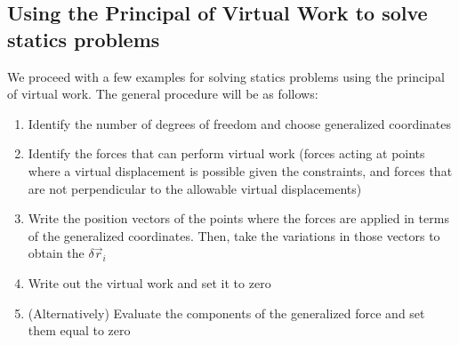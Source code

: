 \subsection{Using the Principal of Virtual Work to solve statics problems}
We proceed with a few examples for solving statics problems using the principal of virtual work. The general procedure will be as follows:
\begin{enumerate}
\item Identify the number of degrees of freedom and choose generalized coordinates 
\item Identify the forces that can perform virtual work (forces acting at points where a virtual displacement is possible given the constraints, and forces that are not perpendicular to the allowable virtual displacements)
\item Write the position vectors of the points where the forces are applied in terms of the generalized coordinates. Then, take the variations in those vectors to obtain the $\delta \vec r_i$
\item Write out the virtual work and set it to zero
\item (Alternatively) Evaluate the components of the generalized force and set them equal to zero
\end{enumerate}



